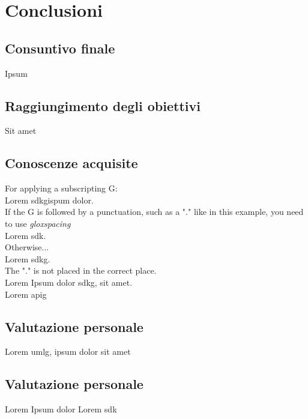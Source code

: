 \chapter{Conclusioni}
\label{chap:conclusioni}

\section{Consuntivo finale}
Ipsum

\section{Raggiungimento degli obiettivi}
Sit amet

\section{Conoscenze acquisite}

For applying a subscripting G:\\
Lorem \gls{sdkg}\glox ispum dolor.\\
If the G is followed by a punctuation, such as a "." like in this example, you need to use \textit{gloxspacing}\\
Lorem \gls{sdk}\glox\gloxspacing.\\
Otherwise... \\
Lorem \gls{sdkg}\glox.\\
The "." is not placed in the correct place.\\
Lorem Ipsum dolor \gls{sdkg}\glox\gloxspacing, sit amet.\\
Lorem \gls{apig}

\section{Valutazione personale}
Lorem \gls{umlg}\glox\gloxspacing, ipsum dolor sit amet

\section{Valutazione personale}
Lorem Ipsum dolor Lorem \gls{sdk}

\newpage